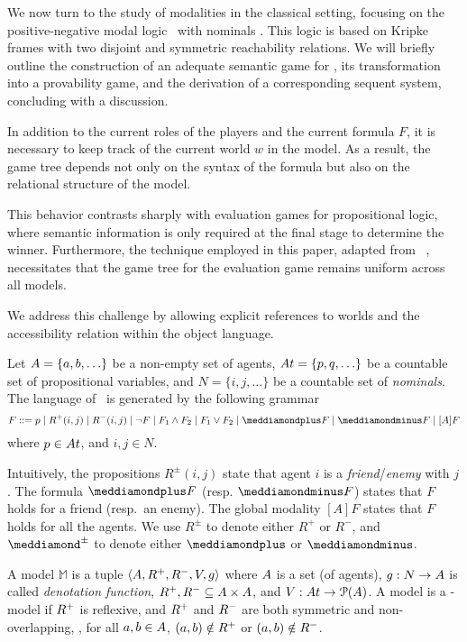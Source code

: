 
We now turn to the study of modalities in the classical setting, focusing on the positive-negative modal logic \PNL\ with nominals \cite{DBLP:journals/jolli/XiongA20,DBLP:journals/logcom/PedersenSA21}. This logic is based on Kripke frames with two disjoint and symmetric reachability relations. We will briefly outline the construction of an adequate semantic game for \PNL, its transformation into a provability game, and the derivation of a corresponding sequent system, concluding with a discussion.

In addition to the current roles of the players and the current formula $F$, it is necessary to keep track of the current world 
$w$ in the model. As a result, the game tree depends not only on the syntax of the formula but also on the relational structure of the model.

This behavior contrasts sharply with evaluation games for propositional logic, where semantic information is only required at the final stage to determine the winner. Furthermore, the technique employed in this paper, adapted from ~\cite{}, necessitates that the game tree for the evaluation game remains uniform across all models.

We address this challenge by allowing explicit references to worlds and the accessibility relation within the object language.

Let $\A=\{\ag,\b,\ldots\}$ be a non-empty set of agents,
$\At=\{p,q,\ldots\}$ be a countable set of propositional variables, and $N=\{i,j,\ldots\}$ be a countable set of \emph{nominals}. The language of \PNL~is generated by the following grammar
$$F  ::= p  \mid R^+(i,j)\mid R^-(i,j) \mid \neg F  \mid F_1  \wedge F_2  \mid F_1  \vee F_2  \mid \dplus F  \mid \dminus F \mid [A]F $$
where $p\in \At$, and $i,j\in N$. 

 Intuitively, the propositions $R^\pm(i,j)$ state that agent $i$ is a  \emph{friend}/\emph{enemy} with
 $j$. 
The formula $\dplus F $ (resp. $\dminus F $) states that $F $ holds for  a friend (resp.\ an enemy). The global
modality $[A]F $ states that $F $ holds for all the agents. 
We use $R^\pm$ to denote either $R^+$ or $R^-$, and 
 $\dplusminus$ to denote either $\dplus$ or $\dminus$. 

A model $\mathbb{M}$ is a tuple $\langle \A,\R^+,\R^-,\V,\g\rangle$ where $\A$
is a set (of agents), $\g:N\rightarrow \A$ is called \emph{denotation
function}, $\R^+,\R^-\subseteq \A\times \A$, and $\V:\At\rightarrow
\mathcal{P}(\A)$. A model is a \PNL-model if 
$\R^+$ is reflexive,  and 
$\R^+$ and $\R^-$ are both symmetric and 
non-overlapping, \ie,  for all $\ag,\b\in \A$, $(\ag,\b)\notin \R^+$ or $(\ag,\b)\notin \R^-$. 